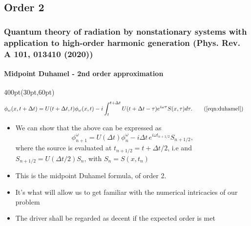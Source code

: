\subsection{Order 2}

\begin{frame}
\frametitle{Quantum theory of radiation by nonstationary systems 
	with application to high-order harmonic generation
        (Phys. Rev. A 101, 013410 (2020))}
	\framesubtitle{Midpoint Duhamel - 2nd order approximation}
\footnotesize
\begin{textblock*}{400pt}(30pt,60pt)
\begin{align}
       \phi_\omega(x,t+\Delta t) & = U(t+\Delta t,t)\phi_\omega(x,t)
	  -i\int_{t}^{t+\Delta t} U(t+\Delta t-\tau)e^{i\omega \tau} S(x,\tau)d\tau. \tag{\ref{eqn:duhamel}}
\end{align}
\begin{itemize}
\item We can show that the above can be expressed as
	\begin{equation}
		\phi^\omega_{n+1} = U(\Delta t) \phi^\omega_{n}
		-i\Delta t\,e^{i\omega t_{n+1/2}}S_{n+1/2},
		 \label{eqn:midpoint_duhamel}
	\end{equation}
		where the source is evaluated at $t_{n+1/2} = t+\Delta t/2$, i.e
		 and $S_{n+1/2} = U(\Delta t/2) S_n$,  with $S_n = S(x,t_n)$
		\vspace{20pt}
\item This is the midpoint Duhamel formula, of order 2.
\item It's what will allow us to get familiar with 
	the numerical intricacies of our problem 
\item The driver shall be regarded as decent if the expected order is met
\end{itemize}

\end{textblock*}

\end{frame}



